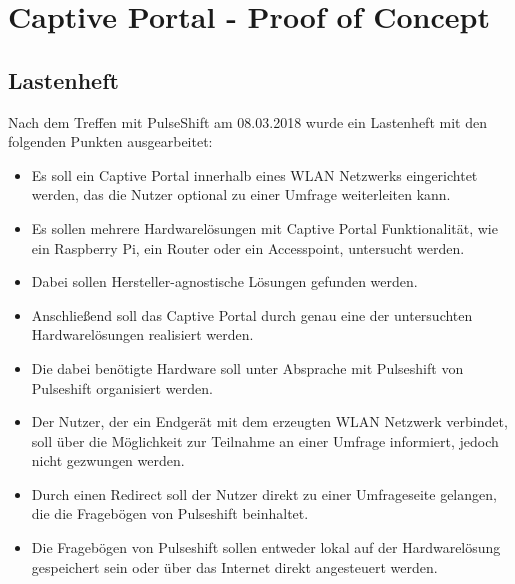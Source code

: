 \section{Captive Portal - Proof of Concept}
\label{section:realisation:captive_portal}
\subsection{Lastenheft}
Nach dem Treffen mit PulseShift am 08.03.2018 wurde ein Lastenheft mit den folgenden Punkten ausgearbeitet:
\begin{itemize}
\item Es soll ein Captive Portal innerhalb eines WLAN Netzwerks eingerichtet werden, das die Nutzer optional zu einer Umfrage weiterleiten kann.
\item Es sollen mehrere Hardwarelösungen mit Captive Portal Funktionalität, wie ein Raspberry Pi, ein Router oder ein Accesspoint, untersucht werden. 
\item Dabei sollen Hersteller-agnostische Lösungen gefunden werden.
\item Anschließend soll das Captive Portal durch genau eine der untersuchten Hardwarelösungen realisiert werden.
\item Die dabei benötigte Hardware soll unter Absprache mit Pulseshift von Pulseshift organisiert werden.
\item Der Nutzer, der ein Endgerät mit dem erzeugten WLAN Netzwerk verbindet, soll über die Möglichkeit zur Teilnahme an einer Umfrage informiert, jedoch nicht gezwungen werden.
\item Durch einen Redirect soll der Nutzer direkt zu einer Umfrageseite gelangen, die die Fragebögen von Pulseshift beinhaltet.
\item Die Fragebögen von Pulseshift sollen entweder lokal auf der Hardwarelösung gespeichert sein oder über das Internet direkt angesteuert werden.
\end{itemize}

